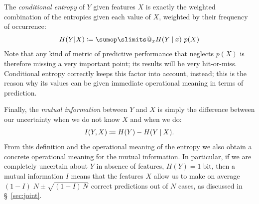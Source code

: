 \documentclass[\ifafour a4paper,12pt,\else a5paper,10pt,\fi%
onecolumn,oneside,article,%
british%
]{memoir}
\makeatletter
\theoremstyle{remark}
\theoremstyle{innote}
\def\sum{\DOTSI\sumop\slimits@}
\newcommand*{\de}{\partialup}%
\newcommand*{\defd}{\coloneqq}
\newcommand*{\p}{\mathrm{p}}%
\renewcommand*{\|}[1][]{\nonscript\:#1\vert\nonscript\:\mathopen{}}
\newcommand*{\sect}{\S}%
\newcommand*{\tsum}{\mathop{\textstyle\sum}\nolimits}
\newcommand*{\bit}{\textrm{bit}}
\makeatother
\begin{document}
The \emph{conditional entropy} of $Y$ given features $X$ is exactly the
weighted combination of the entropies given each value of $X$, weighted by
their frequency of occurrence:
\begin{equation}
  \label{eq:cond_entr}
  H(Y|X) \defd \sum_{x} H(Y\|x)\ p(X)
\end{equation}
Note that any kind of metric of predictive performance that neglects $p(X)$
is therefore missing a very important point; its results will be very
hit-or-miss. Conditional entropy correctly keeps this factor into account,
instead; this is the reason why its values can be given immediate
operational meaning in terms of prediction.


Finally, the \emph{mutual information}  between $Y$ and $X$ is simply the
difference between our uncertainty when we do not know $X$ and when we do:
\begin{equation}
  \label{eq:mutualinfo}
  I(Y,X) \defd H(Y) - H(Y\|X).
\end{equation}
From this definition and the operational meaning of the entropy we also
obtain a concrete operational meaning for the mutual information. In
particular, if we are completely uncertain about $Y$ in absence of
features, $H(Y)=1\;\bit$, then a mutual information $I$ means that the
features $X$ allow us to make on average $(1-I)\;N \pm \sqrt{(1-I)\,N}$
correct predictions out of $N$ cases, as discussed in
\sect~\ref{sec:joint}.




\end{document}
